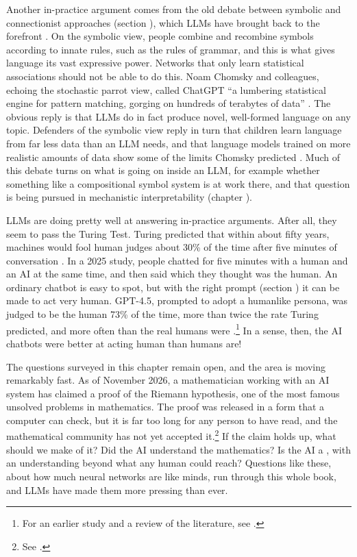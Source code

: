 Another in-practice argument comes from the old debate between symbolic and
connectionist approaches (section ), which LLMs have brought
back to the forefront \cite{king2024large}. On the symbolic view, people
combine and recombine symbols according to innate rules, such as the rules of
grammar, and this is what gives language its vast expressive power. Networks
that only learn statistical associations should not be able to do this. Noam
Chomsky and colleagues, echoing the stochastic parrot view, called ChatGPT ``a lumbering
statistical engine for pattern matching, gorging on hundreds of terabytes of
data'' \cite{chomsky2023noam}. The obvious reply is that LLMs do in fact produce
novel, well-formed language on any topic. Defenders of the symbolic view reply
in turn that children learn language from far less data than an LLM needs, and
that language models trained on more realistic amounts of data show some of
the limits Chomsky predicted \cite{lan2024large}. Much of this debate turns on
what is going on inside an LLM, for example whether something like a
compositional symbol system is at work there, and that question is being
pursued in mechanistic interpretability (chapter ).

LLMs are doing pretty well at answering in-practice arguments. After all, they
seem to pass the Turing Test. Turing predicted that within about
fifty years, machines would fool human judges about 30\% of the time after five
minutes of conversation \cite{turing1950computing}. In a 2025 study, people
chatted for five minutes with a human and an AI at the same time, and then said
which they thought was the human. An ordinary chatbot is easy to spot, but with
the right prompt (section ) it can be made to act very
human. GPT-4.5, prompted to adopt a humanlike persona, was judged to be the
human 73\% of the time, more than twice the rate Turing predicted, and more
often than the real humans were \cite{jones2025large}.\footnote{For an earlier
study and a review of the literature, see \cite{jones2024does}.} In a sense, then, the AI chatbots were better at acting human than humans are!

The questions surveyed in this chapter remain open, and the area is moving remarkably fast. As of November 2026, a mathematician working with an AI system has
claimed a proof of the Riemann hypothesis, one of the most famous unsolved
problems in mathematics. The proof was released in a form that a computer can
check, but it is far too long for any person to have read, and the mathematical
community has not yet accepted it.\footnote{See
.}
If the claim holds up, what should we make of it? Did the AI understand the
mathematics? Is the AI a , with an understanding beyond what any human
could reach? Questions like these, about how much neural networks
are like minds, run through this whole book, and LLMs have made them more
pressing than ever.


